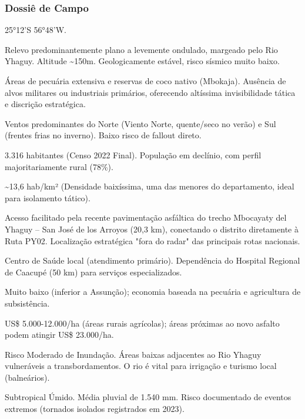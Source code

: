 \subsubsection{Dossiê de Campo}
\begin{description}[style=nextline,leftmargin=0.5cm,font=\bfseries]
\item[Coordenadas]  25°12'S 56°48'W.
\item[Topografia]  Relevo predominantemente plano a levemente ondulado, margeado pelo Rio Yhaguy. Altitude \textasciitilde 150m. Geologicamente estável, risco sísmico muito baixo.
\item[Alvos Estratégicos]  Áreas de pecuária extensiva e reservas de coco nativo (Mbokaja). Ausência de alvos militares ou industriais primários, oferecendo altíssima invisibilidade tática e discrição estratégica.
\item[Fallout]  Ventos predominantes do Norte (Viento Norte, quente/\allowbreak seco no verão) e Sul (frentes frias no inverno). Baixo risco de fallout direto.
\item[População]  3.316 habitantes (Censo 2022 Final). População em declínio, com perfil majoritariamente rural (78\%).
\item[Densidade]  \textasciitilde 13,6 hab/\allowbreak km² (Densidade baixíssima, uma das menores do departamento, ideal para isolamento tático).
\item[Vias de Acesso]  Acesso facilitado pela recente pavimentação asfáltica do trecho Mbocayaty del Yhaguy -- San José de los Arroyos (20,3 km), conectando o distrito diretamente à Ruta PY02. Localização estratégica "fora do radar" das principais rotas nacionais.
\item[Serviços]  Centro de Saúde local (atendimento primário). Dependência do Hospital Regional de Caacupé (50 km) para serviços especializados.
\item[Custo de Vida]  Muito baixo (inferior a Assunção); economia baseada na pecuária e agricultura de subsistência.
\item[Preço da Terra]  US\$ 5.000-12.000/\allowbreak ha (áreas rurais agrícolas); áreas próximas ao novo asfalto podem atingir US\$ 23.000/\allowbreak ha.
\item[Hidrologia]  Risco Moderado de Inundação. Áreas baixas adjacentes ao Rio Yhaguy vulneráveis a transbordamentos. O rio é vital para irrigação e turismo local (balneários).
\item[Clima]  Subtropical Úmido. Média pluvial de 1.540 mm. Risco documentado de eventos extremos (tornados isolados registrados em 2023).

\end{description}
